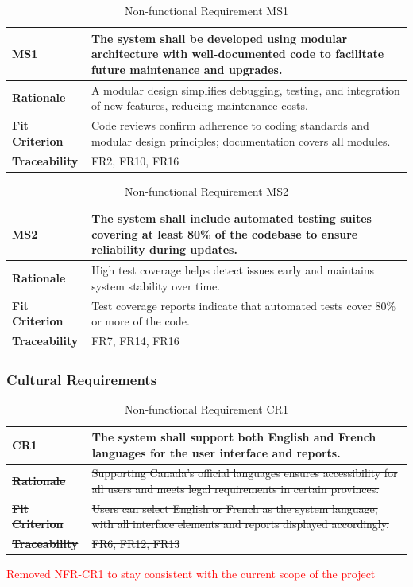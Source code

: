 \documentclass[12pt]{article}
\begin{document}
\begin{table}[h!]
\centering
{}
\begin{tabular}{|p{3.5cm}|p{11.5cm}|}
\hline
\rowcolor{gray!30}
\textbf{MS1} & The system shall be developed using modular architecture with well-documented code to facilitate future maintenance and upgrades. \\
\hline
\textbf{Rationale} & A modular design simplifies debugging, testing, and integration of new features, reducing maintenance costs. \\
\hline
\textbf{Fit Criterion} & Code reviews confirm adherence to coding standards and modular design principles; documentation covers all modules. \\
\hline
\textbf{Traceability} & FR2, FR10, FR16 \\
\hline
\end{tabular}
\caption{Non-functional Requirement MS1}
\end{table}

\begin{table}[h!]
\centering
{}
\begin{tabular}{|p{3.5cm}|p{11.5cm}|}
\hline
\rowcolor{gray!30}
\textbf{MS2} & The system shall include automated testing suites covering at least 80\% of the codebase to ensure reliability during updates. \\
\hline
\textbf{Rationale} & High test coverage helps detect issues early and maintains system stability over time. \\
\hline
\textbf{Fit Criterion} & Test coverage reports indicate that automated tests cover 80\% or more of the code. \\
\hline
\textbf{Traceability} & FR7, FR14, FR16\\
\hline
\end{tabular}
\caption{Non-functional Requirement MS2}
\end{table}
\newpage
\subsubsection{Cultural Requirements}

\begin{table}[h!]
\centering
{}
\begin{tabular}{|p{3.5cm}|p{11.5cm}|}
\hline
\rowcolor{gray!30}
\sout{\textbf{CR1}} & \sout{The system shall support both English and French languages for the user interface and reports.} \\
\hline
\sout{\textbf{Rationale}} & \sout{Supporting Canada's official languages ensures accessibility for all users and meets legal requirements in certain provinces.} \\
\hline
\sout{\textbf{Fit Criterion}} & \sout{Users can select English or French as the system language, with all interface elements and reports displayed accordingly.} \\
\hline
\sout{\textbf{Traceability}} & \sout{FR6, FR12, FR13} \\
\hline
\end{tabular}
\caption{Non-functional Requirement CR1}
\textcolor{red}{Removed NFR-CR1 to stay consistent with the current scope of the project}
\end{table}
\end{document}
